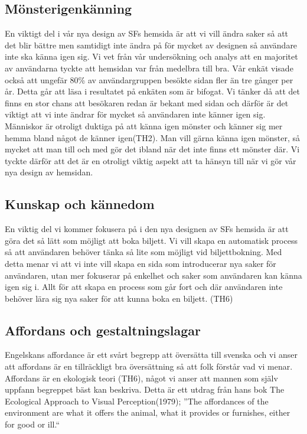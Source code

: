 \documentclass[swedish,a4paper,11pt]{article}
\begin{document}
\subsection{Mönsterigenkänning} 
En viktigt del i vår nya design av SFs hemsida är att vi vill ändra saker så att det blir bättre men samtidigt inte ändra på för mycket av designen så användare inte ska känna igen sig. Vi vet från vår undersökning och analys att en majoritet av användarna tyckte att hemsidan var från medelbra till bra. Vår enkät visade också att ungefär 80\% av användargruppen besökte sidan fler än tre gånger per år. Detta går att läsa i resultatet på enkäten som är bifogat. Vi tänker då att det finns en stor chans att besökaren redan är bekant med sidan och därför är det viktigt att vi inte ändrar för mycket så användaren inte känner igen sig. Människor är otroligt duktiga på att känna igen mönster och känner sig mer hemma bland något de känner igen(TH2). Man vill gärna känna igen mönster, så mycket att man till och med gör det ibland när det inte finns ett mönster där. Vi tyckte därför att det är en otroligt viktig aspekt att ta hänsyn till när vi gör vår nya design av hemsidan. 

\subsection{Kunskap och kännedom}
En viktig del vi kommer fokusera på i den nya designen av SFs hemsida är att göra det så lätt som möjligt att boka biljett. Vi vill skapa en automatisk process så att användaren behöver tänka så lite som möjligt vid biljettbokning. Med detta menar vi att vi inte vill skapa en sida som introducerar nya saker för användaren, utan mer fokuserar på enkelhet och saker som användaren kan känna igen sig i. Allt för att skapa en process som går fort och där användaren inte behöver lära sig nya saker för att kunna boka en biljett. (TH6)

\subsection{Affordans och gestaltningslagar} 
Engelskans affordance är ett svårt begrepp att översätta till svenska och vi anser att affordans är en tillräckligt bra översättning så att folk förstår vad vi menar. Affordans är en ekologisk teori (TH6), något vi anser att mannen som själv uppfann begreppet bäst kan beskriva. Detta är ett utdrag från hans bok The Ecological Approach to Visual Perception(1979); ”The affordances of the environment are what it offers the animal, what it provides or furnishes, either for good or ill.“
\end{document}
